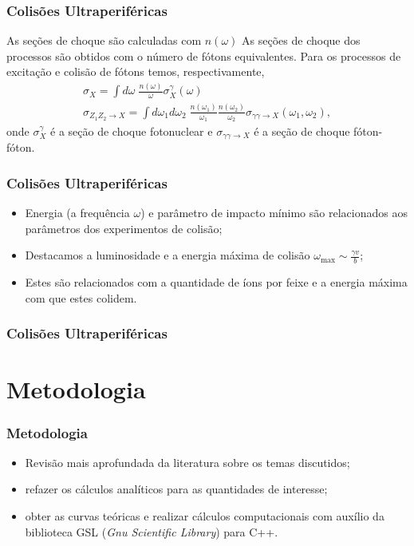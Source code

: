 \documentclass[xcolor=dvipsnames]{beamer}
\begin{document}
\begin{frame}
	\frametitle{Colisões Ultraperiféricas}
	\begin{block}{As seções de choque são calculadas com $n(\omega)$}
		As seções de choque dos processos são obtidos com o número de fótons
		equivalentes. Para os processos de excitação e colisão de fótons temos,
		respectivamente,
		\begin{gather}
			\sigma _X = \int d\omega \; \frac{n(\omega)}{\omega} \sigma _X
			^\gamma (\omega) \\
			\sigma _{Z_1 Z_2 \rightarrow X} = \int d\omega _1 d\omega _2 \;
			\frac{n(\omega _1)}{\omega _1} \frac{n(\omega _2)}{\omega _2}
			\sigma_{\gamma \gamma \rightarrow X}(\omega _1, \omega _2),
		\end{gather}
		onde $\sigma _X ^\gamma$ é a seção de choque fotonuclear e $\sigma
		_{\gamma \gamma \rightarrow X}$ é a seção de choque fóton-fóton.
	\end{block}
\end{frame}

\begin{frame}
	\frametitle{Colisões Ultraperiféricas}
	\begin{itemize}
		\item Energia (a frequência $\omega$) e parâmetro de impacto mínimo
			são relacionados aos parâmetros dos experimentos de colisão;
		\item Destacamos a luminosidade e a energia máxima de colisão
			$\displaystyle \omega _\text{max} \sim \frac{\gamma v}{b}$;
		\item Estes são relacionados com a quantidade de íons por feixe e a
			energia máxima com que estes colidem.
	\end{itemize}
\end{frame}

\begin{frame}
	\frametitle{Colisões Ultraperiféricas}
	\begin{table}
		
		\caption{Parâmetros de experimentos de alguns colisores. Tabela baseada
		em \cite{Workman2022ynf}.}
	\end{table}
\end{frame}

\section{Metodologia}
\begin{frame}
	\frametitle{Metodologia}
	\begin{itemize}
		\item Revisão mais aprofundada da literatura sobre os temas discutidos;
		\item refazer os cálculos analíticos para as quantidades de interesse;
		\item obter as curvas teóricas e realizar cálculos computacionais com
			auxílio da biblioteca GSL (\textit{Gnu Scientific Library}) para
			C++.
	\end{itemize}
\end{frame}
\end{document}
